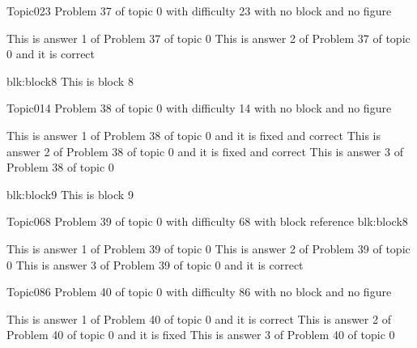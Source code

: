 \documentclass[master]{exam}
\begin{document}
\begin{problem}{Topic0}{23}
	Problem 37 of topic 0 with difficulty 23 with no block and no figure
	\begin{answers}
		\answer This is answer 1 of Problem 37 of topic 0 
		\answer[correct] This is answer 2 of Problem 37 of topic 0 and it is correct
	\end{answers}
\end{problem}



\begin{block}{blk:block8}
This is block 8
\end{block}


\begin{problem}{Topic0}{14}
	Problem 38 of topic 0 with difficulty 14 with no block and no figure
	\begin{answers}
		 This is answer 1 of Problem 38 of topic 0 and it is fixed and correct
		 This is answer 2 of Problem 38 of topic 0 and it is fixed and correct
		\answer This is answer 3 of Problem 38 of topic 0 
	\end{answers}
\end{problem}



\begin{block}{blk:block9}
This is block 9
\end{block}


\begin{problem}[requires=blk:block8]{Topic0}{68}
	Problem 39 of topic 0 with difficulty 68 with block reference blk:block8
	\begin{answers}
		\answer This is answer 1 of Problem 39 of topic 0 
		\answer This is answer 2 of Problem 39 of topic 0 
		\answer[correct] This is answer 3 of Problem 39 of topic 0 and it is correct
	\end{answers}
\end{problem}

\begin{problem}{Topic0}{86}
	Problem 40 of topic 0 with difficulty 86 with no block and no figure
	\begin{answers}
		\answer[correct] This is answer 1 of Problem 40 of topic 0 and it is correct
		\answer[fixed] This is answer 2 of Problem 40 of topic 0 and it is fixed
		\answer This is answer 3 of Problem 40 of topic 0 
	\end{answers}
\end{problem}
\end{document}
